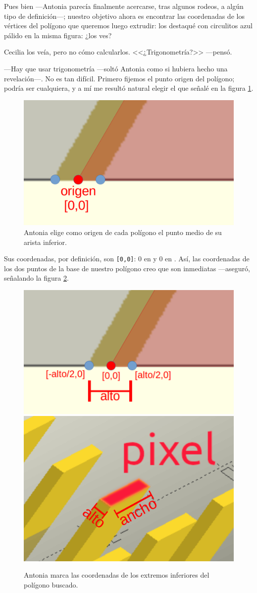\guillemotright Pues bien ---Antonia parecía finalmente acercarse,
tras algunos rodeos, a algún tipo de definición---; nuestro objetivo
ahora es encontrar las coordenadas de los vértices del polígono que
queremos luego extrudir: los destaqué con circulitos azul pálido en la
misma figura: ¿los ves?

Cecilia los veía, pero no cómo calcularlos. <<¿Trigonometría?>>
---pensó.

---Hay que usar trigonometría ---soltó Antonia como si hubiera hecho
una revelación---.  No es tan difícil. Primero fijemos el punto origen
del polígono; podría ser cualquiera, y a mí me resultó natural elegir
el que señalé en la figura \ref{fig:poligono-origen}.

\begin{figure}[ht]
  \centering
  \includegraphics[width=.45\textwidth]{imagenes/poligono-origen}
  \caption{Antonia elige como origen de cada polígono el punto medio
    de su arista inferior.}
  \label{fig:poligono-origen}
\end{figure}


\guillemotright Sus coordenadas, por definición, son \texttt{[0,0]}: 0
en  y 0 en . Así, las coordenadas de los dos puntos
de la base de nuestro polígono creo que son inmediatas ---aseguró,
señalando la figura \ref{fig:poligono-puntos-base}.


\begin{figure}[ht]
  \centering
  \includegraphics[width=.53\textwidth]{imagenes/poligono-puntos-base}\hfill
  \includegraphics[width=.45\textwidth]{imagenes/pixel-alto-ancho}  
  \caption{Antonia marca las coordenadas de los extremos inferiores
    del polígono buscado.}
  \label{fig:poligono-puntos-base}
\end{figure}

